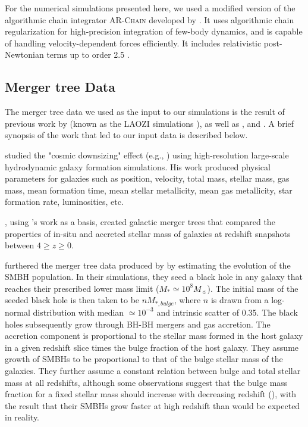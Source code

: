 \documentclass[fleqn,usenatbib,useAMS]{mnras}
\begin{document}
For the numerical simulations presented here, we used a modified version of the algorithmic chain integrator \textsc{AR-Chain} developed by \citet{2006MNRAS.372..219M}. It uses algorithmic chain regularization for high-precision integration of few-body dynamics, and is capable of handling velocity-dependent forces efficiently. It includes relativistic post-Newtonian terms up to order 2.5 \citep{2008AJ....135.2398M}.


\subsection{Merger tree Data}
The merger tree data we used as the input to our simulations is the result of previous work by \citet{2011ApJ...741...99C, 2011ApJ...742L..33C, 2012ApJ...753...17C, 2012ApJ...748..121C, 2013ApJ...770..139C}  (known as the LAOZI simulations \citealt{2014ApJ...781...38C}), as well as  \citet{2012MNRAS.425..641L}, and \citet{2015ApJ...799..178K}.  A brief synopsis of the work that led to our input data is described below.

\citet{2011ApJ...741...99C} studied the "cosmic downsizing" effect (e.g., \citealt{1996AJ....112..839C}) using high-resolution large-scale hydrodynamic galaxy formation simulations.  His work produced physical parameters for galaxies such as position, velocity, total mass, stellar mass, gas mass, mean formation time, mean stellar metallicity, mean gas metallicity, star formation rate, luminosities, etc.

\citet{2012MNRAS.425..641L}, using \citet{2011ApJ...741...99C}'s work as a basis, created galactic merger trees that compared the properties of in-situ and accreted stellar mass of galaxies at redshift snapshots between $4\geq z \geq0$.

\citet{2015ApJ...799..178K} furthered the merger tree data produced by \citet{2012MNRAS.425..641L} by estimating the evolution of the SMBH population.  In their simulations, they seed a black hole in any galaxy that reaches their prescribed lower mass limit ($M_* \simeq 10^8 M_{\sun}$).  The initial mass of the seeded black hole is then taken to be $nM_{*, bulge}$, where $n$ is drawn from a log-normal distribution with median $\simeq10^{-3}$ and intrinsic scatter of 0.35.  The black holes subsequently grow through BH-BH mergers and gas accretion.  The accretion component is proportional to the stellar mass formed in the host galaxy in a given redshift slice times the bulge fraction of the host galaxy.  They assume growth of SMBHs to be proportional to that of the bulge stellar mass of the galaxies.  They further assume a constant relation between bulge and total stellar mass at all redshifts, although some observations suggest that the bulge mass fraction for a fixed stellar mass should increase with decreasing redshift (\citealt{2012MNRAS.423.1992S, 2013MNRAS.428.1351G, 2014MNRAS.441..417A}), with the result that their SMBHs grow faster at high redshift than would be expected in reality.
\end{document}
